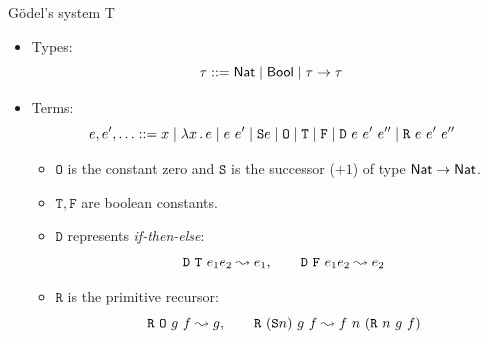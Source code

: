 \documentclass[paper=screen,mode=present,style=zysimple]{powerdot}
\begin{document}
\begin{slide}{G\"odel's system T}
\begin{itemize}
\item Types: 
\vspace*{-0.5em}
\[
\tau ::= \tnat \mid \tbool \mid \tau \to \tau 
\vspace*{-1.5em}
\]
\item Terms: 
\vspace*{-0.5em}
\[
e, e', \ldots ::= x \mid \lambda x \ldot e \mid e \ e' 
\mid \csucc e \mid \czero \mid \mathtt{T} \mid \mathtt{F} \mid \mathtt{D}\  e\ e'\ e''
\mid \mathtt{R}\ e\ e'\ e''
\vspace*{-1em}
\]
\begin{itemize}
\item $\mathtt O$ is the constant zero and $\mathtt S$ is the successor ($+1$) of type $\mathsf{Nat} \to \mathsf{Nat}$. 
\\[0.2em]
\item $\mathtt T, \mathtt F$ are boolean constants.
\\[0.2em]
\item $\mathtt D$ represents {\em if-then-else}:
\vspace*{-0.5em}
\[
\mathtt{D} \ \mathtt{T} \ e_1 e_2 \reduce e_1 , \qquad
\mathtt{D} \ \mathtt{F} \ e_1 e_2 \reduce e_2
\vspace*{-1.5em}
\]
\item $\mathtt R$ is the primitive recursor:
\vspace*{-0.5em}
\[
\mathtt{R} \ \mathtt{O} \ g \ f \reduce g , \qquad
\mathtt{R} \ (\mathtt{S}n) \ g \ f \reduce f \ n \ (\mathtt{R} \ n \ g \ f)
\]
\end{itemize}
\end{itemize}
\end{slide}
\end{document}
